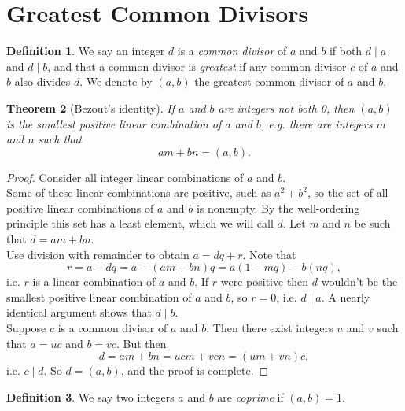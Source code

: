 \documentclass{amsbook}
\numberwithin{section}{chapter}
\theoremstyle{plain}
\newtheorem{thm}{Theorem}[section]
\theoremstyle{definition}
\newtheorem{defn}[thm]{Definition}
\def\br{~\\[1em]}
\begin{document}
\section{Greatest Common Divisors}
\begin{defn}
We say an integer $d$ is a \textit{common divisor} of $a$ and $b$
if both $d\mid a$ and $d\mid b$, and that a common divisor is
\textit{greatest} if any common divisor $c$ of $a$ and $b$
also divides $d$. We denote by $(a, b)$ the greatest common divisor
of $a$ and $b$.
\end{defn}
\begin{thm}[Bezout's identity]
If $a$ and $b$ are integers not both 0, then $(a, b)$ is the smallest
positive linear combination of $a$ and $b$,
e.g. there are integers $m$ and $n$ such that
\[am + bn = (a, b).\]
\end{thm}
\begin{proof}
Consider all integer linear combinations of $a$ and $b$.
\br
Some of these linear
combinations are positive, such as $a^2 + b^2$, so the set of all
positive linear combinations of $a$ and $b$ is nonempty. By the
well-ordering principle this set has a least element, which we
will call $d$. Let $m$ and $n$ be such that $d = am + bn$.
\br
Use division with remainder to obtain
$a = dq + r$.
Note that
\[r = a - dq = a - (am + bn)q = a(1 - mq) - b(nq),\]
i.e. $r$ is a linear combination of $a$ and $b$. If $r$ were positive
then $d$ wouldn't be the smallest positive linear combination of $a$
and $b$, so $r = 0$, i.e. $d\mid a$.
A nearly identical argument shows that $d\mid b$.
\br
Suppose $c$ is a common divisor of $a$ and $b$. Then there exist
integers $u$ and $v$ such that $a = uc$ and $b = vc$.
But then
\[d = am + bn = ucm + vcn = (um + vn)c,\]
i.e. $c\mid d$. So $d = (a, b)$, and the proof is complete.
\end{proof}
\begin{defn}
We say two integers $a$ and $b$ are \textit{coprime} if
$(a, b) = 1$.
\end{defn}
\end{document}
